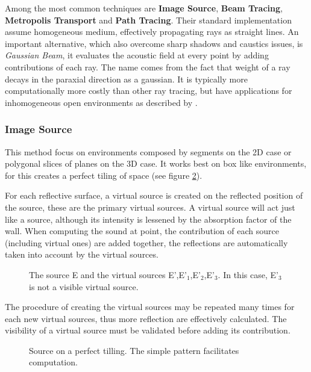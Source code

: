 Among the most common techniques are \textbf{Image Source}, \textbf{Beam
Tracing}, \textbf{Metropolis Transport} and \textbf{Path Tracing}. Their
standard implementation assume homogeneous medium, effectively propagating rays
as straight lines. An important alternative, which also overcome sharp shadows
and caustics issues, is \textit{Gaussian Beam}, it evaluates the acoustic field
at every point by adding contributions of each ray. The name comes from the fact
that weight of a ray decays in the paraxial direction as a gaussian. It is
typically more computationally more costly than other ray tracing, but have
applications for inhomogeneous open environments as described by
\citet{traceroutdoor}.

\subsubsection{Image Source}

This method focus on environments composed by segments on the 2D case or
polygonal slices of planes on the 3D case. It works best on box like
environments, for this creates a perfect tiling of
space\cite{funkhouser2003survey} (see figure \ref{fig:tillingsource}).

For each reflective surface, a virtual source is created on the reflected
position of the source, these are the primary virtual sources. A virtual source
will act just like a source, although its intensity is lessened by the absorption
factor of the wall. When computing the sound at point, the
contribution of each source (including virtual ones) are added together, the
reflections are automatically taken into account by the virtual sources.

\begin{figure}[h]
	\centering
	
	\caption{The source E and the virtual sources E',E'$_1$,E'$_2$,E'$_3$. In this
	case, E'$_3$ is not a visible virtual source.}
	\label{fig:imagesource}
\end{figure}


The procedure of creating the virtual sources may be repeated many times for
each new virtual sources, thus more reflection are effectively calculated. The
visibility of a virtual source must be validated before adding its contribution.

\begin{figure}[h]
	\centering
	
	\caption{Source on a perfect tilling. The simple pattern facilitates
	computation.}
	\label{fig:tillingsource}
\end{figure}

